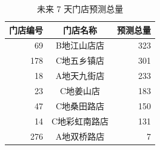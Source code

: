 \begin{table}[H]
\centering
\caption{未来 7 天门店预测总量}
\begin{tabular}{rcr}
\toprule
门店编号 & 门店名称 & 预测总量 \\
\midrule
69 & B地江山店店 & 323 \\
178 & C地五乡镇店 & 301 \\
18 & A地天九街店 & 233 \\
23 & C地姜山店 & 183 \\
47 & C地桑田路店 & 150 \\
14 & C地彩虹南路店 & 131 \\
276 & A地双桥路店 & 7 \\
\bottomrule
\end{tabular}
\end{table}

